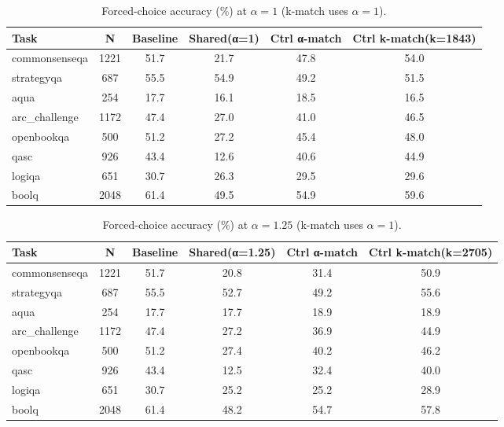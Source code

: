 \begin{table}[t]
\centering
\caption{Forced-choice accuracy (\%) at $\alpha=1$ (k-match uses $\alpha=1$).}
\label{tab:energy_kmatch_alpha_1}
\begin{tabular}{lccccc}
\hline
Task & N & Baseline & Shared(α=1) & Ctrl α-match & Ctrl k-match(k=1843) \\
\hline
commonsenseqa & 1221 & 51.7 & 21.7 & 47.8 & 54.0 \\
strategyqa & 687 & 55.5 & 54.9 & 49.2 & 51.5 \\
aqua & 254 & 17.7 & 16.1 & 18.5 & 16.5 \\
arc\_challenge & 1172 & 47.4 & 27.0 & 41.0 & 46.5 \\
openbookqa & 500 & 51.2 & 27.2 & 45.4 & 48.0 \\
qasc & 926 & 43.4 & 12.6 & 40.6 & 44.9 \\
logiqa & 651 & 30.7 & 26.3 & 29.5 & 29.6 \\
boolq & 2048 & 61.4 & 49.5 & 54.9 & 59.6 \\
\hline
\end{tabular}
\end{table}

\begin{table}[t]
\centering
\caption{Forced-choice accuracy (\%) at $\alpha=1.25$ (k-match uses $\alpha=1$).}
\label{tab:energy_kmatch_alpha_1_25}
\begin{tabular}{lccccc}
\hline
Task & N & Baseline & Shared(α=1.25) & Ctrl α-match & Ctrl k-match(k=2705) \\
\hline
commonsenseqa & 1221 & 51.7 & 20.8 & 31.4 & 50.9 \\
strategyqa & 687 & 55.5 & 52.7 & 49.2 & 55.6 \\
aqua & 254 & 17.7 & 17.7 & 18.9 & 18.9 \\
arc\_challenge & 1172 & 47.4 & 27.2 & 36.9 & 44.9 \\
openbookqa & 500 & 51.2 & 27.4 & 40.2 & 46.2 \\
qasc & 926 & 43.4 & 12.5 & 32.4 & 40.0 \\
logiqa & 651 & 30.7 & 25.2 & 25.2 & 28.9 \\
boolq & 2048 & 61.4 & 48.2 & 54.7 & 57.8 \\
\hline
\end{tabular}
\end{table}

